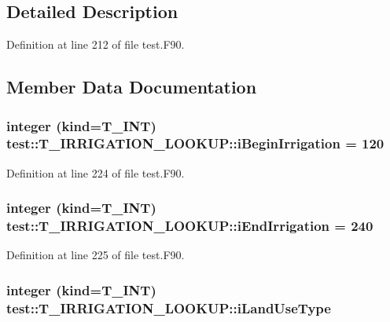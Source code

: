 \subsection{Detailed Description}


Definition at line 212 of file test.F90.



\subsection{Member Data Documentation}
\hypertarget{typetest_1_1_t___i_r_r_i_g_a_t_i_o_n___l_o_o_k_u_p_a5d80101947edb7f7e7649d7eb3ff6192}{
\subsubsection[{iBeginIrrigation}]{\setlength{\rightskip}{0pt plus 5cm}integer (kind={\bf T\_\-INT}) {\bf test::T\_\-IRRIGATION\_\-LOOKUP::iBeginIrrigation} = 120}}
\label{typetest_1_1_t___i_r_r_i_g_a_t_i_o_n___l_o_o_k_u_p_a5d80101947edb7f7e7649d7eb3ff6192}


Definition at line 224 of file test.F90.

\hypertarget{typetest_1_1_t___i_r_r_i_g_a_t_i_o_n___l_o_o_k_u_p_a684d0b67bfdaee841cc996b15ac6c1d2}{
\subsubsection[{iEndIrrigation}]{\setlength{\rightskip}{0pt plus 5cm}integer (kind={\bf T\_\-INT}) {\bf test::T\_\-IRRIGATION\_\-LOOKUP::iEndIrrigation} = 240}}
\label{typetest_1_1_t___i_r_r_i_g_a_t_i_o_n___l_o_o_k_u_p_a684d0b67bfdaee841cc996b15ac6c1d2}


Definition at line 225 of file test.F90.

\hypertarget{typetest_1_1_t___i_r_r_i_g_a_t_i_o_n___l_o_o_k_u_p_adbef98eaee47ddb9ab546dcab4527308}{
\subsubsection[{iLandUseType}]{\setlength{\rightskip}{0pt plus 5cm}integer (kind={\bf T\_\-INT}) {\bf test::T\_\-IRRIGATION\_\-LOOKUP::iLandUseType}}}
\label{typetest_1_1_t___i_r_r_i_g_a_t_i_o_n___l_o_o_k_u_p_adbef98eaee47ddb9ab546dcab4527308}


